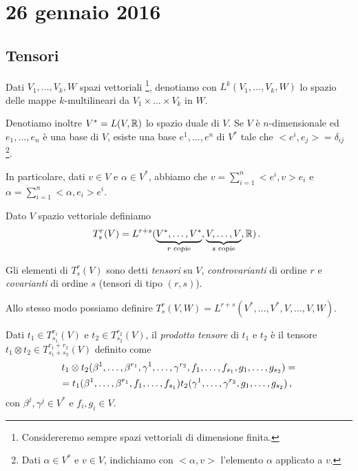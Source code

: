 \chapter{26 gennaio 2016}

\section{Tensori}
Dati $V_1,\dots,V_k,W$ spazi vettoriali \footnote{Considereremo sempre spazi vettoriali di dimensione finita.}, denotiamo con $L^k(V_1,\dots,V_k,W)$ lo spazio delle mappe $k$-multilineari da $V_1\times\dots\times V_k$ in $W$.

Denotiamo inoltre $V^* = L(V,\mathbb R)$ lo spazio duale di $V$.
Se $V$ è $n$-dimensionale ed $e_1,\dots,e_n$ è una base di $V$, esiste una base $e^1,\dots,e^n$ di $V^*$ tale che $<e^i,e_j> = \delta_{ij}$ \footnote{Dati $\alpha \in V^*$ e $v\in V$, indichiamo con $<\alpha, v>$ l'elemento $\alpha$ applicato a $v$.}.

In particolare, dati $v\in V$ e $\alpha \in V^*$, abbiamo che $v= \sum_{i=1}^n <e^i,v> e_i$ e $\alpha= \sum_{i=1}^n <\alpha,e_i> e^i$.

\begin{definition}
	Dato $V$ spazio vettoriale definiamo 
	\begin{equation*}
	T_s^r(V) = L^{r+s} (\underbrace{V^*,\dots,V^*}_{\text{$r$ copie}},\underbrace{V,\dots,V}_{\text{$s$ copie}},\mathbb R) \, \text{. }
	\end{equation*}
	
	Gli elementi di $T_s^r(V)$ sono detti \emph{tensori} su $V$, \emph{controvarianti} di ordine $r$ e \emph{covarianti} di ordine $s$ (tensori di tipo $(r,s)$).
\end{definition}

\begin{remark}
	Allo stesso modo possiamo definire $T_s^r(V,W) = L^{r+s} (V^*,\dots,V^*,V,\dots,V,W)$.
\end{remark}


\begin{definition}
	Dati $t_1\in T_{s_1}^{r_1}(V)$ e $t_2\in T_{s_2}^{r_2}(V)$, il \emph{prodotto tensore} di $t_1$ e $t_2$ è il tensore $t_1\otimes t_2 \in T_{s_1+s_2}^{r_1+r_2}(V)$ definito come 
	\begin{multline*}
		t_1\otimes t_2(\beta^1,\dots,\beta^{r_1},\gamma^1,\dots,\gamma^{r_2}, f_1,\dots,f_{s_1},g_1,\dots,g_{s_2}) =\\
		=t_1(\beta^1,\dots,\beta^{r_1},f_1,\dots,f_{s_1})t_2(\gamma^1,\dots,\gamma^{r_2},g_1,\dots,g_{s_2}) \, \text{, }
	\end{multline*}
	con $\beta^j,\gamma^j\in V^*$ e $f_i,g_i\in V$.
\end{definition}

